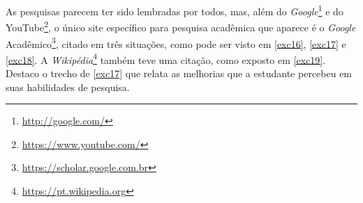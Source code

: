 \documentclass{textolivre}
\begin{document}
As pesquisas parecem ter sido lembradas por todos, mas, além do \textit{Google}\footnote{\url{http://google.com/}} e do YouTube\footnote{\url{https://www.youtube.com/}}, o único site específico para pesquisa acadêmica que aparece é o \textit{Google} Acadêmico\footnote{\url{https://scholar.google.com.br}}, citado em três situações, como pode ser visto em \ref{exc16}, \ref{exc17} e \ref{exc18}. A \textit{Wikipédia}\footnote{\url{https://pt.wikipedia.org}} também teve uma citação, como exposto em \ref{exc19}. Destaco o trecho de \ref{exc17} que relata as melhorias que a estudante percebeu em suas habilidades de pesquisa.

\end{document}
